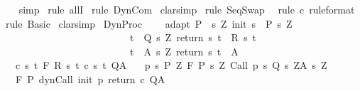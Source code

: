 \begin{isabellebody}
\isamarkupfalse%
\ {}\ \isamarkupfalse%
\ simp\isanewline
{}\isamarkupfalse%
\ {\isacharparenleft}rule\ allI{\isacharparenright}\isanewline
{}\isamarkupfalse%
\ {\isacharparenleft}rule\ DynCom{\isacharparenright}\isanewline
{}\isamarkupfalse%
\ clarsimp\isanewline
{}\isamarkupfalse%
\ {\isacharparenleft}rule\ SeqSwap{\isacharparenright}\isanewline
{}\isamarkupfalse%
\ \ {\isacharparenleft}rule\ c\ {\isacharbrackleft}rule{\isacharunderscore}format{\isacharbrackright}{\isacharparenright}\isanewline
{}\isamarkupfalse%
\ {\isacharparenleft}rule\ Basic{\isacharparenright}\isanewline
{}\isamarkupfalse%
\ clarsimp\isanewline
{}\isamarkupfalse%
%
\endisatagproof
{\isafoldproof}%
%
\isadelimproof
\isanewline
%
\endisadelimproof
\isanewline
{}\isamarkupfalse%
\ DynProc{\isacharprime}{\isacharcolon}\ \isanewline
\ \ \ adapt{\isacharcolon}\ {\isachardoublequoteopen}P\ {\isasymsubseteq}\ {\isacharbraceleft}s{\isachardot}\ {\isasymexists}Z{\isachardot}\ init\ s\ {\isasymin}\ P{\isacharprime}\ s\ Z\ {\isasymand}\isanewline
\ \ \ \ \ \ \ \ \ \ \ \ \ \ \ \ \ \ \ \ \ \ \ \ \ \ {\isacharparenleft}{\isasymforall}t\ {\isasymin}\ Q{\isacharprime}\ s\ Z{\isachardot}\ return\ s\ t\ {\isasymin}\ R\ s\ t{\isacharparenright}\ {\isasymand}\isanewline
\ \ \ \ \ \ \ \ \ \ \ \ \ \ \ \ \ \ \ \ \ \ \ \ \ \ {\isacharparenleft}{\isasymforall}t\ {\isasymin}\ A{\isacharprime}\ s\ Z{\isachardot}\ return\ s\ t\ {\isasymin}\ A{\isacharparenright}{\isacharbraceright}{\isachardoublequoteclose}\isanewline
\ \ \ c{\isacharcolon}\ {\isachardoublequoteopen}{\isasymforall}s\ t{\isachardot}\ {\isasymGamma}{\isacharcomma}{\isasymTheta}{\isasymturnstile}\isactrlbsub {\isacharslash}F\isactrlesub \ {\isacharparenleft}R\ s\ t{\isacharparenright}\ {\isacharparenleft}c\ s\ t{\isacharparenright}\ Q{\isacharcomma}A{\isachardoublequoteclose}\isanewline
\ \ \ p{\isacharcolon}\ {\isachardoublequoteopen}{\isasymforall}s{\isasymin}\ P{\isachardot}\ {\isasymforall}Z{\isachardot}\ {\isasymGamma}{\isacharcomma}{\isasymTheta}{\isasymturnstile}\isactrlbsub {\isacharslash}F\isactrlesub \ {\isacharparenleft}P{\isacharprime}\ s\ Z{\isacharparenright}\ Call\ {\isacharparenleft}p\ s{\isacharparenright}\ {\isacharparenleft}Q{\isacharprime}\ s\ Z{\isacharparenright}{\isacharcomma}{\isacharparenleft}A{\isacharprime}\ s\ Z{\isacharparenright}{\isachardoublequoteclose}\isanewline
\ \ \ {\isachardoublequoteopen}{\isasymGamma}{\isacharcomma}{\isasymTheta}{\isasymturnstile}\isactrlbsub {\isacharslash}F\isactrlesub \ P\ dynCall\ init\ p\ return\ c\ Q{\isacharcomma}A{\isachardoublequoteclose}\isanewline

\end{isabellebody}
